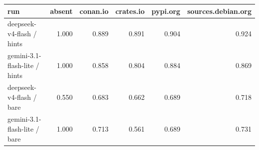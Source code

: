 \begin{tabular}{lrrrrr}
\toprule
run & absent & conan.io & crates.io & pypi.org & sources.debian.org \\
\midrule
deepseek-v4-flash / hints & 1.000 & 0.889 & 0.891 & 0.904 & 0.924 \\
gemini-3.1-flash-lite / hints & 1.000 & 0.858 & 0.804 & 0.884 & 0.869 \\
deepseek-v4-flash / bare & 0.550 & 0.683 & 0.662 & 0.689 & 0.718 \\
gemini-3.1-flash-lite / bare & 1.000 & 0.713 & 0.561 & 0.689 & 0.731 \\
\bottomrule
\end{tabular}
